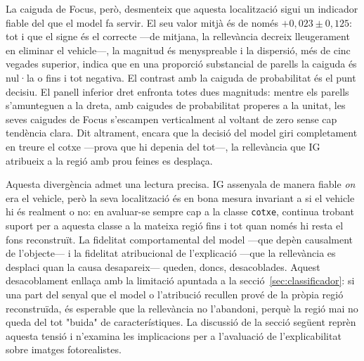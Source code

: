 La caiguda de Focus, però, desmenteix que aquesta localització sigui un indicador fiable del que el model fa servir. El seu valor mitjà és de només $+0{,}023 \pm 0{,}125$: tot i que el signe és el correcte —de mitjana, la rellevància decreix lleugerament en eliminar el vehicle—, la magnitud és menyspreable i la dispersió, més de cinc vegades superior, indica que en una proporció substancial de parells la caiguda és nul·la o fins i tot negativa. El contrast amb la caiguda de probabilitat és el punt decisiu. El panell inferior dret enfronta totes dues magnituds: mentre els parells s'amunteguen a la dreta, amb caigudes de probabilitat properes a la unitat, les seves caigudes de Focus s'escampen verticalment al voltant de zero sense cap tendència clara. Dit altrament, encara que la decisió del model giri completament en treure el cotxe —prova que hi depenia del tot—, la rellevància que \ac{IG} atribueix a la regió amb prou feines es desplaça.

Aquesta divergència admet una lectura precisa. \ac{IG} assenyala de manera fiable \emph{on} era el vehicle, però la seva localització és en bona mesura invariant a si el vehicle hi és realment o no: en avaluar-se sempre cap a la classe \texttt{cotxe}, continua trobant suport per a aquesta classe a la mateixa regió fins i tot quan només hi resta el fons reconstruït. La fidelitat comportamental del model —que depèn causalment de l'objecte— i la fidelitat atribucional de l'explicació —que la rellevància es desplaci quan la causa desapareix— queden, doncs, desacoblades. Aquest desacoblament enllaça amb la limitació apuntada a la secció~\ref{sec:classificador}: si una part del senyal que el model o l'atribució recullen prové de la pròpia regió reconstruïda, és esperable que la rellevància no l'abandoni, perquè la regió mai no queda del tot "buida" de característiques. La discussió de la secció següent reprèn aquesta tensió i n'examina les implicacions per a l'avaluació de l'explicabilitat sobre imatges fotorealistes.